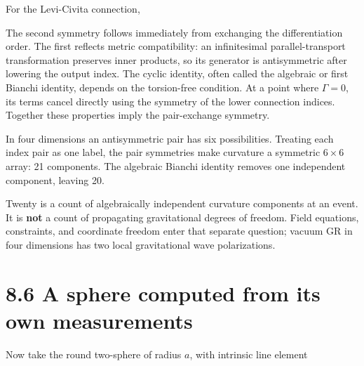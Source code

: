 \documentclass[
  11pt,
  letterpaper,
  oneside,
  openany]{scrbook}
\begin{document}
For the Levi-Civita connection,

\begin{center}
\begingroup
{}
\ifdim\wd\grmathbox>\linewidth
\resizebox{\linewidth}{!}{\usebox{\grmathbox}}
\else\usebox{\grmathbox}\fi
\endgroup
\end{center}

The second symmetry follows immediately from exchanging the
differentiation order. The first reflects metric compatibility: an
infinitesimal parallel-transport transformation preserves inner
products, so its generator is antisymmetric after lowering the output
index. The cyclic identity, often called the algebraic or first Bianchi
identity, depends on the torsion-free condition. At a point where
\(\Gamma=0\), its terms cancel directly using the symmetry of the lower
connection indices. Together these properties imply the pair-exchange
symmetry.

In four dimensions an antisymmetric pair has six possibilities. Treating
each index pair as one label, the pair symmetries make curvature a
symmetric \(6\times6\) array: 21 components. The algebraic Bianchi
identity removes one independent component, leaving 20.

Twenty is a count of algebraically independent curvature components at
an event. It is \textbf{not} a count of propagating gravitational
degrees of freedom. Field equations, constraints, and coordinate freedom
enter that separate question; vacuum GR in four dimensions has two local
gravitational wave polarizations.

\hypertarget{a-sphere-computed-from-its-own-measurements}{%
\section{8.6 A sphere computed from its own
measurements}\label{a-sphere-computed-from-its-own-measurements}}

Now take the round two-sphere of radius \(a\), with intrinsic line
element
\end{document}
